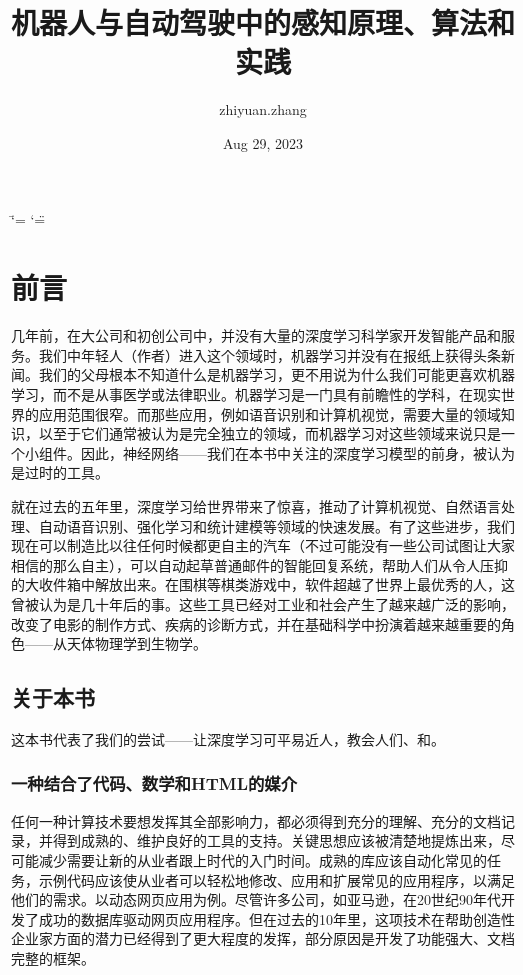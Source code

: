 \documentclass[letterpaper,10pt,english]{sphinxmanual}
\title{机器人与自动驾驶中的感知原理、算法和实践}
\date{Aug 29, 2023}
\author{zhiyuan.zhang}
\begin{document}
\ifdefined\shorthandoff
  \ifnum\catcode`\=\string=\active\shorthandoff{=}\fi
  \ifnum\catcode`\"=\active{}\fi
\fi

\pagestyle{empty}
\sphinxmaketitle
\pagestyle{plain}
\sphinxtableofcontents
\pagestyle{normal}
\label{\detokenize{index::doc}}


\sphinxstepscope


\chapter*{前言}

\label{\detokenize{chapter_preface/index:id1}}\label{\detokenize{chapter_preface/index::doc}}
\sphinxAtStartPar
几年前，在大公司和初创公司中，并没有大量的深度学习科学家开发智能产品和服务。我们中年轻人（作者）进入这个领域时，机器学习并没有在报纸上获得头条新闻。我们的父母根本不知道什么是机器学习，更不用说为什么我们可能更喜欢机器学习，而不是从事医学或法律职业。机器学习是一门具有前瞻性的学科，在现实世界的应用范围很窄。而那些应用，例如语音识别和计算机视觉，需要大量的领域知识，以至于它们通常被认为是完全独立的领域，而机器学习对这些领域来说只是一个小组件。因此，神经网络——我们在本书中关注的深度学习模型的前身，被认为是过时的工具。

\sphinxAtStartPar
就在过去的五年里，深度学习给世界带来了惊喜，推动了计算机视觉、自然语言处理、自动语音识别、强化学习和统计建模等领域的快速发展。有了这些进步，我们现在可以制造比以往任何时候都更自主的汽车（不过可能没有一些公司试图让大家相信的那么自主），可以自动起草普通邮件的智能回复系统，帮助人们从令人压抑的大收件箱中解放出来。在围棋等棋类游戏中，软件超越了世界上最优秀的人，这曾被认为是几十年后的事。这些工具已经对工业和社会产生了越来越广泛的影响，改变了电影的制作方式、疾病的诊断方式，并在基础科学中扮演着越来越重要的角色——从天体物理学到生物学。


\section*{关于本书}
\label{\detokenize{chapter_preface/index:id2}}
\sphinxAtStartPar
这本书代表了我们的尝试——让深度学习可平易近人，教会人们、和。


\subsection*{一种结合了代码、数学和HTML的媒介}
\label{\detokenize{chapter_preface/index:html}}
\sphinxAtStartPar
任何一种计算技术要想发挥其全部影响力，都必须得到充分的理解、充分的文档记录，并得到成熟的、维护良好的工具的支持。关键思想应该被清楚地提炼出来，尽可能减少需要让新的从业者跟上时代的入门时间。成熟的库应该自动化常见的任务，示例代码应该使从业者可以轻松地修改、应用和扩展常见的应用程序，以满足他们的需求。以动态网页应用为例。尽管许多公司，如亚马逊，在20世纪90年代开发了成功的数据库驱动网页应用程序。但在过去的10年里，这项技术在帮助创造性企业家方面的潜力已经得到了更大程度的发挥，部分原因是开发了功能强大、文档完整的框架。
\end{document}
